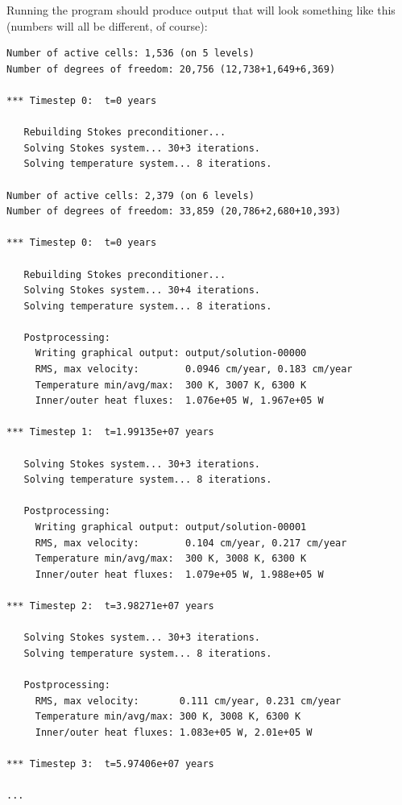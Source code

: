\documentclass{article}
\begin{document}
Running the program should produce output that will look something like this
(numbers will all be different, of course):
\begin{lstlisting}[frame=single,language=ksh]
Number of active cells: 1,536 (on 5 levels)
Number of degrees of freedom: 20,756 (12,738+1,649+6,369)

*** Timestep 0:  t=0 years

   Rebuilding Stokes preconditioner...
   Solving Stokes system... 30+3 iterations.
   Solving temperature system... 8 iterations.

Number of active cells: 2,379 (on 6 levels)
Number of degrees of freedom: 33,859 (20,786+2,680+10,393)

*** Timestep 0:  t=0 years

   Rebuilding Stokes preconditioner...
   Solving Stokes system... 30+4 iterations.
   Solving temperature system... 8 iterations.

   Postprocessing:
     Writing graphical output: output/solution-00000
     RMS, max velocity:        0.0946 cm/year, 0.183 cm/year
     Temperature min/avg/max:  300 K, 3007 K, 6300 K
     Inner/outer heat fluxes:  1.076e+05 W, 1.967e+05 W

*** Timestep 1:  t=1.99135e+07 years

   Solving Stokes system... 30+3 iterations.
   Solving temperature system... 8 iterations.

   Postprocessing:
     Writing graphical output: output/solution-00001
     RMS, max velocity:        0.104 cm/year, 0.217 cm/year
     Temperature min/avg/max:  300 K, 3008 K, 6300 K
     Inner/outer heat fluxes:  1.079e+05 W, 1.988e+05 W

*** Timestep 2:  t=3.98271e+07 years

   Solving Stokes system... 30+3 iterations.
   Solving temperature system... 8 iterations.

   Postprocessing:
     RMS, max velocity:       0.111 cm/year, 0.231 cm/year
     Temperature min/avg/max: 300 K, 3008 K, 6300 K
     Inner/outer heat fluxes: 1.083e+05 W, 2.01e+05 W

*** Timestep 3:  t=5.97406e+07 years

...
\end{lstlisting}
\end{document}
